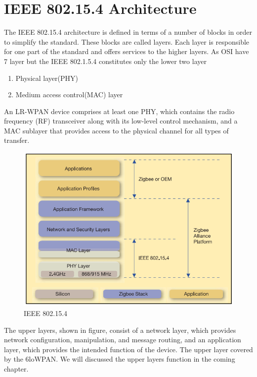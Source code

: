 \section{IEEE 802.15.4 Architecture}
The IEEE 802.15.4 architecture is defined in terms of a number of blocks in order to simplify the standard. These blocks are called layers. Each layer is responsible for one part of the standard and offers services to the higher layers. As OSI have 7 layer but the IEEE 802.1.5.4 constitutes only the lower two layer\\
\begin{enumerate}

	\item{Physical layer(PHY)}
	\item{Medium access control(MAC) layer}
\end{enumerate}
	An LR-WPAN device comprises at least one PHY, which contains the radio frequency (RF) transceiver along with its low-level control mechanism, and a MAC sublayer that provides access to the physical channel for all types of transfer.



\begin{figure}[ht]
	\centering
	\includegraphics[scale=0.7]{images/ieee.png}
	\caption{IEEE 802.15.4}
\end{figure}
The upper layers, shown in figure, consist of a network layer, which provides network configuration, manipulation, and message routing, and an application layer, which provides the intended function of the device. The upper layer covered by the 6loWPAN. We will discussed the upper layers function in the coming chapter.
